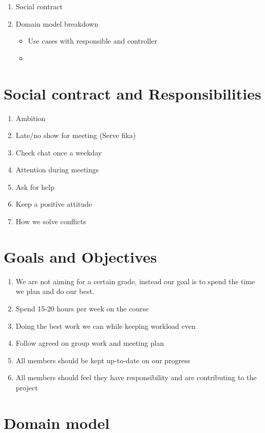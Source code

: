 \begin{enumerate}
\item Social contract
\item Domain model breakdown
\begin{itemize}
\item Use cases with responsible and controller
\item 
\end{itemize}
\end{enumerate}

\section{Social contract and Responsibilities}
\begin{enumerate}
    \item Ambition
    \item Late/no show for meeting (Serve fika)
    \item Check chat once a weekday
    \item Attention during meetings
    \item Ask for help
    \item Keep a positive attitude
    \item How we solve conflicts
\end{enumerate}

\section{Goals and Objectives}
\begin{enumerate}
    \item We are not aiming for a certain grade, instead our goal is to spend the time we plan and do our best.
    \item Spend 15-20 hours per week on the course
    \item Doing the best work we can while keeping workload even
    \item Follow agreed on group work and meeting plan
    \item All members should be kept up-to-date on our progress
    \item All members should feel they have responsibility and are contributing to the project
\end{enumerate}

\section{Domain model}

